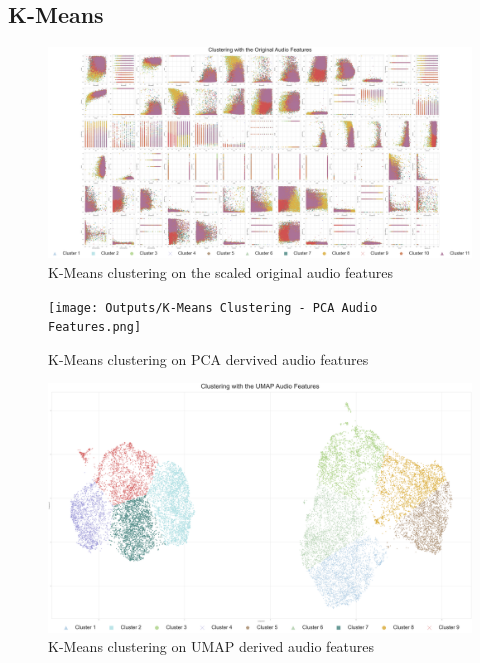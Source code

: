 \begin{appendix}
\subsection{K-Means}
\begin{figure}[h]
    \centering
    \includegraphics[scale=0.08]{Outputs/K-Means Clustering - Original Audio Features.png}
    \caption{K-Means clustering on the scaled original audio features}
    \label{fig:kmeans-first}
\end{figure}
\begin{figure}[!htb]
    \centering
    \texttt{[image: Outputs/K-Means Clustering - PCA Audio Features.png]}
    \caption{K-Means clustering on PCA dervived audio features}
    \label{fig:kmeans-second}
\end{figure}
\begin{figure}[!htb]
    \centering
    \includegraphics[scale=0.08]{Outputs/K-Means Clustering - UMAP Audio Features.png}
    \caption{K-Means clustering on UMAP derived audio features}
    \label{fig:kmeans-third}
\end{figure}
\begin{figure}[!htb]
    \centering

\end{figure}
\end{appendix}
